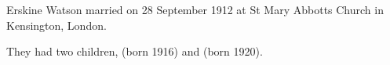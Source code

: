 
Erskine Watson married  on 28 September 1912 at St Mary Abbotts Church in Kensington, London.

They had two children,  (born 1916) and  (born 1920).
